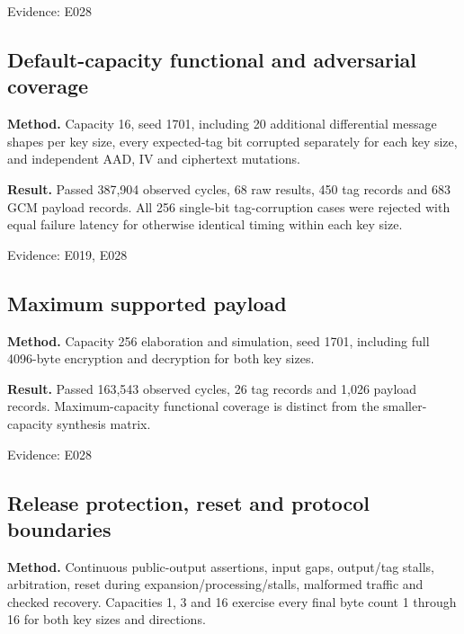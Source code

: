 \documentclass[11pt,a4paper]{article}
\begin{document}
{\small Evidence: E028}

\subsection{Default-capacity functional and adversarial coverage}

\textbf{Method.} Capacity 16,\allowbreak{} seed 1701,\allowbreak{} including 20 additional differential message shapes per key size,\allowbreak{} every expected-tag bit corrupted separately for each key size,\allowbreak{} and independent AAD,\allowbreak{} IV and ciphertext mutations.

\textbf{Result.} Passed 387,\allowbreak{}904 observed cycles,\allowbreak{} 68 raw results,\allowbreak{} 450 tag records and 683 GCM payload records. All 256 single-bit tag-corruption cases were rejected with equal failure latency for otherwise identical timing within each key size.

{\small Evidence: E019,\allowbreak{} E028}

\subsection{Maximum supported payload}

\textbf{Method.} Capacity 256 elaboration and simulation,\allowbreak{} seed 1701,\allowbreak{} including full 4096-byte encryption and decryption for both key sizes.

\textbf{Result.} Passed 163,\allowbreak{}543 observed cycles,\allowbreak{} 26 tag records and 1,\allowbreak{}026 payload records. Maximum-capacity functional coverage is distinct from the smaller-capacity synthesis matrix.

{\small Evidence: E028}

\subsection{Release protection,\allowbreak{} reset and protocol boundaries}

\textbf{Method.} Continuous public-output assertions,\allowbreak{} input gaps,\allowbreak{} output/\allowbreak{}tag stalls,\allowbreak{} arbitration,\allowbreak{} reset during expansion/\allowbreak{}processing/\allowbreak{}stalls,\allowbreak{} malformed traffic and checked recovery. Capacities 1,\allowbreak{} 3 and 16 exercise every final byte count 1 through 16 for both key sizes and directions.
\end{document}
